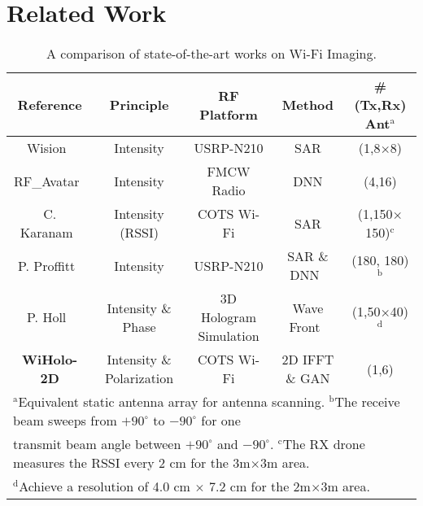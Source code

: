 \section{Related Work}
\label{sec-related-work}
\begin{table*}[t]
    \caption{A comparison of state-of-the-art works on Wi-Fi Imaging.}
    \vspace{2mm}
    \begin{center}
    \begin{tabular}{ccccc}
    \hline
     Reference  & Principle &  RF Platform & Method & \#(Tx,Rx) Ant$^{\mathrm{a}}$\\ 
    \hline
    Wision~\cite{wision}  & Intensity & USRP-N210 & SAR & (1,8$\times$8)\\ 
    RF\_Avatar~\cite{rf_avatar}  & Intensity & FMCW Radio & DNN & (4,16)\\ 
    C. Karanam~\cite{3dimaging_uav} & Intensity (RSSI) & COTS Wi-Fi & SAR & (1,150$\times$150)$^{\mathrm{c}}$\\ 
    P. Proffitt~\cite{imaging_1} & Intensity & USRP-N210 & SAR \& DNN~\cite{MaskRCNN} & (180, 180)$^{\mathrm{b}}$\\ 
    P. Holl~\cite{holography} & Intensity \& Phase & 3D Hologram Simulation & Wave Front~\cite{angular} & (1,50$\times$40)$^{\mathrm{d}}$\\ 
    \hline
    \textbf{\textsf{WiHolo-2D}} & Intensity \& Polarization & COTS Wi-Fi & 2D IFFT \& GAN &(1,6) \\
    \hline
    \multicolumn{5}{l}{$^{\mathrm{a}}$Equivalent static antenna array for antenna scanning. $^{\mathrm{b}} $The receive beam sweeps from $+90^{\circ}$ to $-90^{\circ}$ for one}\\
    \multicolumn{5}{l}{transmit beam angle between $+90^{\circ}$ and $-90^{\circ}$. $^{\mathrm{c}}$The RX drone measures the RSSI every 2 cm for the 3m$\times$3m area.}\\
    \multicolumn{5}{l}{$^{\mathrm{d}}$Achieve a resolution of 4.0 cm $\times$ 7.2 cm for the 2m$\times$3m area.}\\
    \end{tabular}
    \label{comparison}
    \end{center}
\end{table*}

